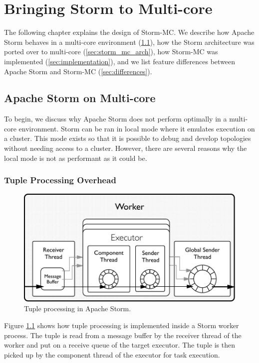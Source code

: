 \chapter{Bringing Storm to Multi-core}

The following chapter explains the design of Storm-MC. We describe how Apache Storm behaves in a multi-core environment (\ref{sec:storm_on_mc}), how the Storm architecture was ported over to multi-core (\ref{sec:storm_mc_arch}), how Storm-MC was implemented  (\ref{sec:implementation}), and we list feature differences between Apache Storm and Storm-MC (\ref{sec:differences}).

\section{Apache Storm on Multi-core}
\label{sec:storm_on_mc}

To begin, we discuss why Apache Storm does not perform optimally in a multi-core environment. Storm can be ran in local mode where it emulates execution on a cluster. This mode exists so that it is possible to debug and develop topologies without needing access to a cluster. However, there are several reasons why the local mode is not as performant as it could be.

\subsection{Tuple Processing Overhead}

\begin{figure}[!htb]
	\centering
	\includegraphics[scale=0.7]{pdf/worker_inside.pdf}
	\caption{Tuple processing in Apache Storm.}
	\label{fig:worker_inside}
\end{figure}

Figure \ref{fig:worker_inside} shows how tuple processing is implemented inside a Storm worker process. The tuple is read from a message buffer by the receiver thread of the worker and put on a receive queue of the target executor. The tuple is then picked up by the component thread of the executor for task execution.

